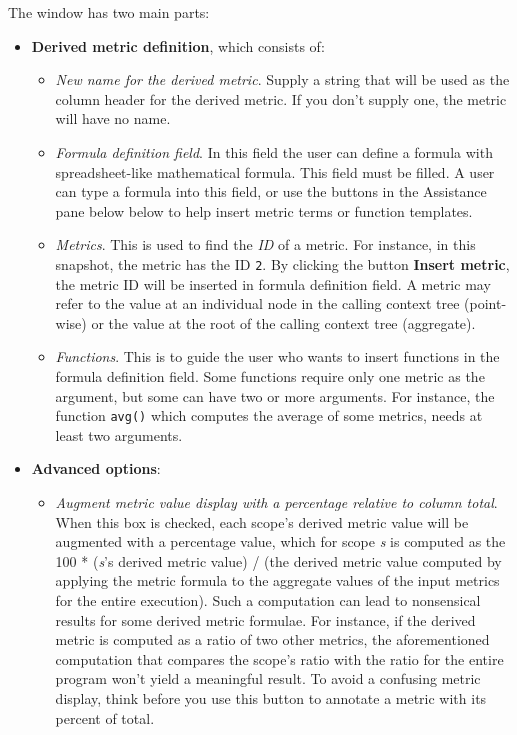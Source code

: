 The window has two main parts:
\begin{itemize}

\item \textbf{Derived metric definition}, which consists of:

\begin{itemize}

\item \textit{New name for the derived metric}.
  Supply a string that will be used as the column header for the derived metric.
  If you don't supply one, the metric will have no name.

\item \textit{Formula definition field}.
  In this field the user can define a formula with spreadsheet-like mathematical formula.
  This field must be filled. A user can type a formula into this field, or use the buttons in the Assistance pane below below to help insert metric terms or function templates. 

\item \textit{Metrics}.
  This is used to find the \textit{ID} of a metric.
  For instance, in this snapshot, the metric  has the ID \texttt{2}.
  By clicking the button \textbf{Insert metric}, the metric ID will be inserted in formula definition field. A metric may refer to the value at an individual node in the calling context tree (point-wise) or the value at the root of the calling context tree (aggregate).

\item \textit{Functions}.
  This is to guide the user who wants to insert functions in the formula definition field.
  Some functions require only one metric as the argument, but some can have two or more arguments.
  For instance, the function \texttt{avg()} which computes the average of some metrics, needs at least two arguments.
\end{itemize}

\item \textbf{Advanced options}:
\begin{itemize}

\item \textit{Augment metric value display with a percentage relative to column total}.
  When this box is checked, each scope's derived metric value will be augmented with a percentage value, which for scope \textit{s} is computed as the 100 * (\textit{s}'s derived metric value) / (the derived metric value computed by applying the metric formula to the aggregate values of the input metrics for the entire execution).
  Such a computation can lead to nonsensical results for some derived metric formulae.
  For instance, if the derived metric is computed as a ratio of two other metrics, the aforementioned computation that compares the scope's ratio with the ratio for the entire program won't yield a meaningful result.
  To avoid a confusing metric display, think before you use this button to annotate a metric with its percent of total.


\end{itemize}
\end{itemize}
